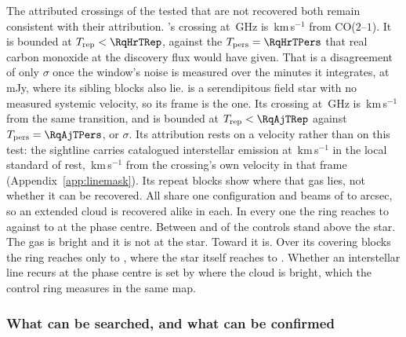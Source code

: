 The \MkAttrExcl{} attributed crossings of the \MkAttrTested{} tested that are
not recovered both remain consistent with their attribution. \RqHrStar's crossing at \RqHrFreq\,GHz is \RqHrDv\,km\,s$^{-1}$ from
CO($2$--$1$). It is bounded at $T_{\rm rep}<\RqHrTRep$, against the
$T_{\rm pers}=\RqHrTPers$ that real carbon monoxide at the discovery flux
would have given. That is a disagreement of only \RqHrExcl$\sigma$ once the
window's noise is measured over the \RqHrOnsMin{} minutes it integrates, at
\RqHrRms\,mJy, where its sibling blocks also lie. \RqAjStar{} is a serendipitous field star with no measured systemic
velocity, so its frame is the \RqAjFrame{} one. Its crossing at
\RqAjFreq\,GHz is \RqAjDv\,km\,s$^{-1}$ from the same transition, and is
bounded at $T_{\rm rep}<\RqAjTRep$ against $T_{\rm pers}=\RqAjTPers$, or
\RqAjExcl$\sigma$. Its attribution rests
on a velocity rather than on this test: the sightline carries catalogued
interstellar emission at \LsLupVco\,km\,s$^{-1}$ in the local standard of
rest,
\LsLupDv\,km\,s$^{-1}$ from the crossing's own velocity in that frame
(Appendix~\ref{app:linemask}). Its repeat blocks show where that gas lies, not
whether it can be recovered. All \RqAjNRep{} share one \RqAjArray{} configuration and beams of
\RqAjBeamLo{} to \RqAjBeamHi{} arcsec, so an extended cloud is recovered
alike in each. In every one the ring reaches \RqAjCtrlLo{} to \RqAjCtrlHi{} against
\RqAjStarLo{} to \RqAjStarHi{} at the phase centre. Between \RqAjNgeLo{} and
\RqAjNgeHi{} of the \NCtrl{} controls stand above the star.
The gas is bright and it is not at the star. Toward \RqRecurCloudStars{} it is. Over its \RqCtlNBlock{} covering blocks
the ring reaches only \RqCtlRingLo{} to \RqCtlRingHi, where the star itself
reaches \RqCtlStarLo{} to \RqCtlStarHi.
Whether an interstellar line recurs at the phase centre is set by where the cloud
is bright, which the control ring measures in the same map.

\subsubsection{What can be searched, and what can be confirmed}
\label{sec:confirmability}

